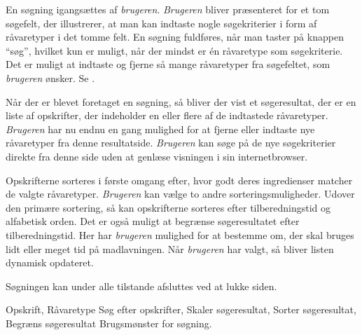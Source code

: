 {En søgning igangsættes af \textit{brugeren}. \textit{Brugeren} bliver præsenteret for et tom søgefelt, der illustrerer, at man kan indtaste nogle søgekriterier i form af råvaretyper i det tomme felt. En søgning fuldføres, når man taster på knappen ``søg'', hvilket kun er muligt, når der mindst er én råvaretype som søgekriterie. Det er muligt at indtaste og fjerne så mange råvaretyper fra søgefeltet, som \textit{brugeren} ønsker. Se .

Når der er blevet foretaget en søgning, så bliver der vist et søgeresultat, der er en liste af opskrifter, der indeholder en eller flere af de indtastede råvaretyper. \textit{Brugeren} har nu endnu en gang mulighed for at fjerne eller indtaste nye råvaretyper fra denne resultatside. \textit{Brugeren} kan søge på de nye søgekriterier direkte fra denne side uden at genlæse visningen i sin internetbrowser.

Opskrifterne sorteres i første omgang efter, hvor godt deres ingredienser matcher de valgte råvaretyper. \textit{Brugeren} kan vælge to andre sorteringsmuligheder. Udover den primære sortering, så kan opskrifterne sorteres efter tilberedningstid og alfabetisk orden. Det er også muligt at begrænse søgeresultatet efter tilberedningstid. Her har \textit{brugeren} mulighed for at bestemme om, der skal bruges lidt eller meget tid på madlavningen. Når \textit{brugeren} har valgt, så bliver listen dynamisk opdateret.

Søgningen kan under alle tilstande afsluttes ved at lukke siden.}
{Opskrift, Råvaretype}
{Søg efter opskrifter, Skaler søgeresultat, Sorter søgeresultat, Begræns søgeresultat}
{Brugsmønster for søgning.}
